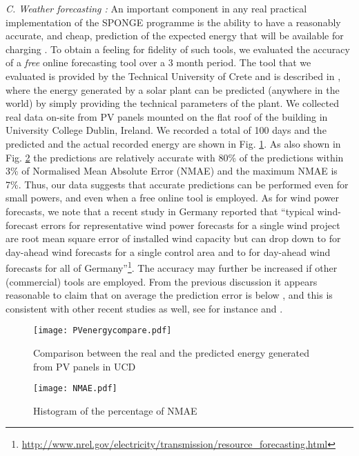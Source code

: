 \documentclass[journal]{IEEEtran}
\begin{document}
{\em C. Weather forecasting :} An important component in any real practical implementation of the SPONGE programme is the ability to have a reasonably accurate, and cheap, prediction of the expected energy that will be available for charging . To obtain a feeling for fidelity of such tools, we evaluated the accuracy of a {\em free}  online forecasting tool over a 3 month period. The tool that we evaluated is provided by the Technical University of Crete and is described in \cite{energyPredication}, where the energy generated by a solar plant can be predicted (anywhere in the world) by simply providing the technical parameters of the plant. We collected real data on-site from PV panels mounted on the flat roof of the building in University College Dublin, Ireland. We recorded a total of 100 days and the predicted and the actual recorded energy are shown in Fig. \ref{UCDNMAEbias}. As also shown in Fig. \ref{UCDNMAE} the predictions are relatively accurate with 80\% of the predictions within 3\% of Normalised Mean Absolute Error (NMAE) and the maximum NMAE is 7\%. Thus, our data suggests that accurate predictions can be performed even for small powers, and even when a free online tool is employed. As for wind power forecasts, we note that a recent study in Germany reported that ``typical wind-forecast errors for representative wind power forecasts for a single wind project are  root mean square error of installed wind capacity but can drop down to  for day-ahead wind forecasts for a single control area and to  for day-ahead wind forecasts for all of Germany''\footnote{\url{http://www.nrel.gov/electricity/transmission/resource_forecasting.html}}. The accuracy may further be increased if other (commercial) tools are employed. From the previous discussion it appears reasonable to claim that on average the prediction error is below , and this is consistent with other recent studies as well, see for instance \cite{wind} and \cite{solar}.


\begin{figure}[htbp]
	\begin{center}
		{\texttt{[image: PVenergycompare.pdf]}}
		\caption{Comparison between the real and the predicted energy generated from PV panels in UCD}
		\label{UCDNMAEbias}
	\end{center}
\end{figure}

\begin{figure}[htbp]
	\begin{center}
		{\texttt{[image: NMAE.pdf]}}
		\caption{Histogram of the percentage of NMAE}
		\label{UCDNMAE}
	\end{center}
\end{figure}
\end{document}
